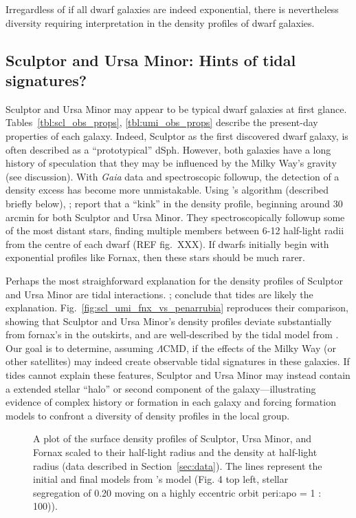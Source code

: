 Irregardless of if all dwarf galaxies are indeed exponential, there is
nevertheless diversity requiring interpretation in the density profiles
of dwarf galaxies.

\subsection{Sculptor and Ursa Minor: Hints of tidal
signatures?}\label{sculptor-and-ursa-minor-hints-of-tidal-signatures}

Sculptor and Ursa Minor may appear to be typical dwarf galaxies at first
glance. Tables~\ref{tbl:scl_obs_props}, \ref{tbl:umi_obs_props} describe
the present-day properties of each galaxy. Indeed, Sculptor as the first
discovered dwarf galaxy, is often described as a ``prototypical'' dSph.
However, both galaxies have a long history of speculation that they may
be influenced by the Milky Way's gravity (see discussion). With
\emph{Gaia} data and spectroscopic followup, the detection of a density
excess has become more unmistakable. Using \citet{jensen+2024}'s
algorithm (described briefly below), \citet{sestito+2023a};
\citet{sestito+2023b} report that a ``kink'' in the density profile,
beginning around 30 arcmin for both Sculptor and Ursa Minor. They
spectroscopically followup some of the most distant stars, finding
multiple members between 6-12 half-light radii from the centre of each
dwarf (REF fig.~XXX). If dwarfs initially begin with exponential
profiles like Fornax, then these stars should be much rarer.

Perhaps the most straighforward explanation for the density profiles of
Sculptor and Ursa Minor are tidal interactions. \citet{sestito+2023a};
\citet{sestito+2023b} conclude that tides are likely the explanation.
Fig.~\ref{fig:scl_umi_fnx_vs_penarrubia} reproduces their comparison,
showing that Sculptor and Ursa Minor's density profiles deviate
substantially from fornax's in the outskirts, and are well-described by
the tidal model from \citet{PNM2008}. Our goal is to determine, assuming
\(\Lambda\)CMD, if the effects of the Milky Way (or other satellites)
may indeed create observable tidal signatures in these galaxies. If
tides cannot explain these features, Sculptor and Ursa Minor may instead
contain a extended stellar ``halo'' or second component of the
galaxy---illustrating evidence of complex history or formation in each
galaxy and forcing formation models to confront a diversity of density
profiles in the local group.

\begin{figure}
\centering
{}
\caption[Sculptor and Ursa Minor match tidal models]{A plot of the
surface density profiles of Sculptor, Ursa Minor, and Fornax scaled to
their half-light radius and the density at half-light radius (data
described in Section~\ref{sec:data}). The lines represent the initial
and final models from \citet{PNM2008}'s model (Fig. 4 top left, stellar
segregation of 0.20 moving on a highly eccentric orbit peri:apo = 1 :
100)).}\label{fig:scl_umi_vs_penarrubia}
\end{figure}

